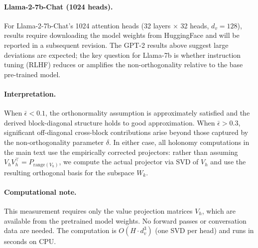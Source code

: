\paragraph{Llama-2-7b-Chat (1024 heads).}
For Llama-2-7b-Chat's 1024 attention heads (32 layers $\times$ 32 heads, $d_v = 128$),
results require downloading the model weights from HuggingFace and will be reported in a
subsequent revision. The GPT-2 results above suggest large deviations are expected;
the key question for Llama-7b is whether instruction tuning (RLHF) reduces or amplifies
the non-orthogonality relative to the base pre-trained model.

\paragraph{Interpretation.}
When $\bar{\epsilon} < 0.1$, the orthonormality assumption is approximately satisfied and
the derived block-diagonal structure holds to good approximation. When $\bar{\epsilon} >
0.3$, significant off-diagonal cross-block contributions arise beyond those captured by
the non-orthogonality parameter $\delta$. In either case, all holonomy computations in
the main text use the empirically corrected projectors: rather than assuming $V_h V_h^\top
= P_{\mathrm{range}(V_h)}$, we compute the actual projector via SVD of $V_h$ and use the
resulting orthogonal basis for the subspace $W_k$.

\paragraph{Computational note.}
This measurement requires only the value projection matrices $V_h$, which are available
from the pretrained model weights. No forward passes or conversation data are needed. The
computation is $O(H \cdot d_v^3)$ (one SVD per head) and runs in seconds on CPU.
